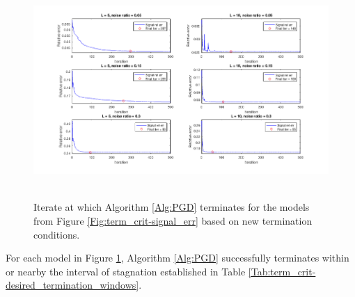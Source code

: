 \begin{figure}[H]
\centering
\hbox{\hspace{-1.9cm} \includegraphics[scale=0.6]{term_crit-model_term_for_tols} }\vspace{-0.4cm}
	\caption{Iterate at which Algorithm \ref{Alg:PGD} terminates for the models from Figure \ref{Fig:term_crit-signal_err} based on new termination conditions.}
\label{Fig:term_crit-model_term_for_tols}
\end{figure}

For each model in Figure \ref{Fig:term_crit-model_term_for_tols}, Algorithm \ref{Alg:PGD} successfully terminates within or nearby the interval of stagnation established in Table \ref{Tab:term_crit-desired_termination_windows}.




